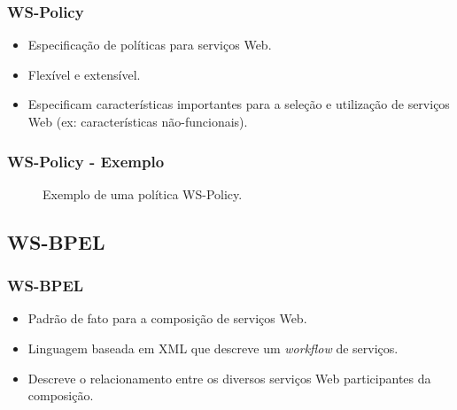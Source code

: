 \documentclass[red, cover=invisible, theme=Warsaw]{myslides}
\begin{document}
	
	\begin{frame}\frametitle{WS-Policy}
	    \begin{itemize}
		\item Especificação de políticas para serviços Web.
		\item Flexível e extensível.
		\item Especificam características importantes para a seleção e utilização de serviços Web (ex: características não-funcionais).
	    \end{itemize}
	\end{frame}
	
	\begin{frame}\frametitle{WS-Policy - Exemplo}
	    \begin{figure}[!htb]
		\centering
		
	    \caption{Exemplo de uma política WS-Policy.}
	    \end{figure}
	\end{frame}
	
    \subsection{WS-BPEL}
    
	\begin{frame}\frametitle{WS-BPEL}	
	    \begin{itemize}
		\item Padrão de fato para a composição de serviços Web.
		\item Linguagem baseada em XML que descreve um \textit{workflow} de serviços.
		\item Descreve o relacionamento entre os diversos serviços Web participantes da composição.                                           
	    \end{itemize}	 
	\end{frame}
	
\end{document}

